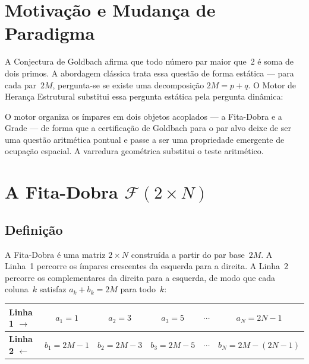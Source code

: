 \documentclass[12pt,a4paper]{article}
\theoremstyle{definition}
\begin{document}
\section{Motivação e Mudança de Paradigma}
\label{sec:motivacao}

A Conjectura de Goldbach afirma que todo número par maior que~2 é soma de
dois primos. A abordagem clássica trata essa questão de forma estática —
para cada par~$2M$, pergunta-se se existe uma decomposição $2M = p + q$.
O Motor de Herança Estrutural substitui essa pergunta estática pela
pergunta dinâmica:

\begin{center}
\end{center}

\noindent O motor organiza os ímpares em dois objetos acoplados — a
Fita-Dobra e a Grade — de forma que a certificação de Goldbach para o par
alvo deixe de ser uma questão aritmética pontual e passe a ser uma
propriedade emergente de ocupação espacial. A varredura geométrica
substitui o teste aritmético.

\section{A Fita-Dobra \texorpdfstring{$\mathcal{F}(2{\times}N)$}{F(2xN)}}
\label{sec:fita}

\subsection{Definição}
\label{subsec:fita-def}

A Fita-Dobra é uma matriz $2{\times}N$ construída a partir do par base~$2M$.
A Linha~1 percorre os ímpares crescentes da esquerda para a direita. A
Linha~2 percorre os complementares da direita para a esquerda, de modo que
cada coluna~$k$ satisfaz $a_k + b_k = 2M$ para todo~$k$:

\renewcommand{\arraystretch}{1.4}
\begin{center}
\begin{tabular}{>{\bfseries}l ccccc}
	\toprule
	\textbf{Linha 1} $\rightarrow$ & $a_1 = 1$ & $a_2 = 3$ & $a_3 = 5$ & $\cdots$ & $a_N = 2N{-}1$ \\
	\midrule
	Linha 2 $\leftarrow$ & $b_1 = 2M{-}1$ & $b_2 = 2M{-}3$ & $b_3 = 2M{-}5$ & $\cdots$ & $b_N = 2M{-}(2N{-}1)$ \\
	\bottomrule
\end{tabular}
\end{center}
\end{document}

